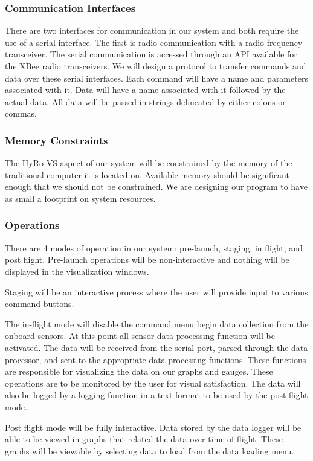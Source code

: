 \documentclass[10pt,draftclsnofoot,onecolumn,compsoc]{IEEEtran}
\begin{document}
\subsubsection{Communication Interfaces}
There are two interfaces for communication in our system and both require the use of a serial interface. The first is radio communication with a radio frequency transceiver. The serial communication is accessed through an API available for the XBee radio transceivers. We will design a protocol to transfer commands and data over these serial interfaces. Each command will have a name and parameters associated with it. Data will have a name associated with it followed by the actual data. All data will be passed in strings delineated by either colons or commas.

\subsubsection{Memory Constraints}
The HyRo VS aspect of our system will be constrained by the memory of the traditional computer it is located on. Available memory should be significant enough that we should not be constrained. We are designing our program to have as small a footprint on system resources.\par 


\subsubsection {Operations}
There are 4 modes of operation in our system: pre-launch, staging, in flight, and post flight.  Pre-launch operations will be non-interactive and nothing will be displayed in the visualization windows. \par
	Staging will be an interactive process where the user will provide input to various command buttons.\par
	
	The in-flight mode will disable the command menu begin data collection from the onboard sensors. At this point all sensor data processing function will be activated. The data will be received from the serial port, parsed through the data processor, and sent to the appropriate data processing functions. These functions are responsible for visualizing the data on our graphs and gauges. These operations are to be monitored by the user for visual satisfaction.  The data will also be logged by a logging function in a text format to be used by the post-flight mode. \par
	Post flight mode will be fully interactive. Data stored by the data logger will be able to be viewed in graphs that related the data over time of flight. These graphs will be viewable by selecting data to load from the data loading menu.\par
\end{document}
